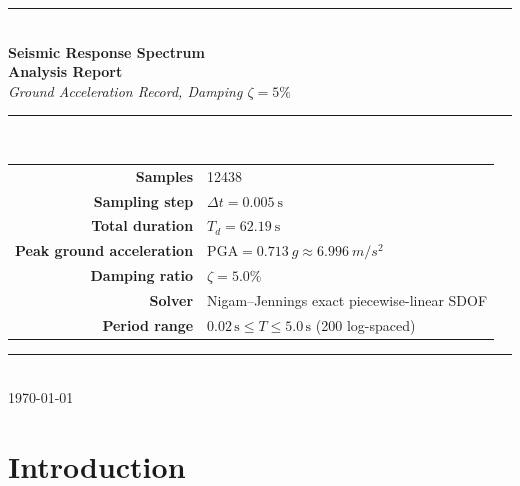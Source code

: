 \documentclass[11pt,a4paper]{article}
\begin{document}
\begin{titlepage}
\centering
\vspace*{2cm}
{\color{rule}\rule{\linewidth}{0.6pt}}\\[0.4cm]
{\Huge\bfseries\color{primary} Seismic Response Spectrum\\[0.25cm] Analysis Report}\\[0.4cm]
{\large\itshape Ground Acceleration Record, Damping $\zeta = 5\%$}\\[0.2cm]
{\color{rule}\rule{\linewidth}{0.6pt}}\\[2.5cm]

\begin{tabular}{rl}
\textbf{Samples}         & \num{12438} \\
\textbf{Sampling step}   & $\Delta t = \SI{0.005}{\second}$ \\
\textbf{Total duration}  & $T_d = \SI{62.19}{\second}$ \\
\textbf{Peak ground acceleration} & $\mathrm{PGA} = \SI{0.713}{g} \approx \SI{6.996}{m/s^2}$ \\
\textbf{Damping ratio}   & $\zeta = 5.0\%$ \\
\textbf{Solver}          & Nigam--Jennings exact piecewise-linear SDOF \\
\textbf{Period range}    & $0.02\,\mathrm{s} \le T \le 5.0\,\mathrm{s}$ (200 log-spaced) \\
\end{tabular}

\vfill
{\color{rule}\rule{\linewidth}{0.4pt}}\\[0.2cm]
{\small \today}
\end{titlepage}

\tableofcontents
\thispagestyle{fancy}
\newpage

\section{Introduction}
\end{document}
